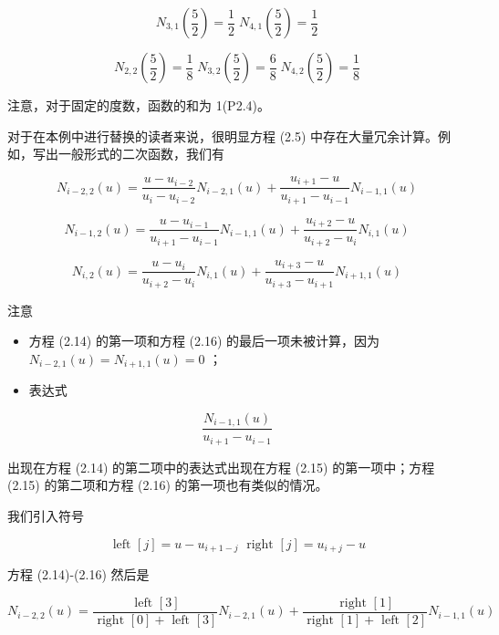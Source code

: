 \documentclass[../main.tex]{subfiles}
\begin{document}
\[
{N}_{3,1}\left( \frac{5}{2}\right)  = \frac{1}{2}\;{N}_{4,1}\left( \frac{5}{2}\right)  = \frac{1}{2}
\]

\[
{N}_{2,2}\left( \frac{5}{2}\right)  = \frac{1}{8}\;{N}_{3,2}\left( \frac{5}{2}\right)  = \frac{6}{8}\;{N}_{4,2}\left( \frac{5}{2}\right)  = \frac{1}{8}
\]

注意，对于固定的度数，函数的和为 1(P2.4)。

对于在本例中进行替换的读者来说，很明显方程 (2.5) 中存在大量冗余计算。例如，写出一般形式的二次函数，我们有

\[
{N}_{i - 2,2}\left( u\right)  = \frac{u - {u}_{i - 2}}{{u}_{i} - {u}_{i - 2}}{N}_{i - 2,1}\left( u\right)  + \frac{{u}_{i + 1} - u}{{u}_{i + 1} - {u}_{i - 1}}{N}_{i - 1,1}\left( u\right)  \tag{2.14}
\]

\[
{N}_{i - 1,2}\left( u\right)  = \frac{u - {u}_{i - 1}}{{u}_{i + 1} - {u}_{i - 1}}{N}_{i - 1,1}\left( u\right)  + \frac{{u}_{i + 2} - u}{{u}_{i + 2} - {u}_{i}}{N}_{i,1}\left( u\right)  \tag{2.15}
\]

\[
{N}_{i,2}\left( u\right)  = \frac{u - {u}_{i}}{{u}_{i + 2} - {u}_{i}}{N}_{i,1}\left( u\right)  + \frac{{u}_{i + 3} - u}{{u}_{i + 3} - {u}_{i + 1}}{N}_{i + 1,1}\left( u\right)  \tag{2.16}
\]

注意

\begin{itemize}
\item 方程 (2.14) 的第一项和方程 (2.16) 的最后一项未被计算，因为 \({N}_{i - 2,1}\left( u\right)  = {N}_{i + 1,1}\left( u\right)  = 0\) ；
\end{itemize}

\begin{itemize}
\item 表达式
\end{itemize}

\[
\frac{{N}_{i - 1,1}\left( u\right) }{{u}_{i + 1} - {u}_{i - 1}}
\]

出现在方程 (2.14) 的第二项中的表达式出现在方程 (2.15) 的第一项中；方程 (2.15) 的第二项和方程 (2.16) 的第一项也有类似的情况。

我们引入符号

\[
\text{ left }\left\lbrack  j\right\rbrack   = u - {u}_{i + 1 - j}\;\text{ right }\left\lbrack  j\right\rbrack   = {u}_{i + j} - u
\]

方程 (2.14)-(2.16) 然后是

\[
{N}_{i - 2,2}\left( u\right)  = \frac{\text{ left }\left\lbrack  3\right\rbrack  }{\text{ right }\left\lbrack  0\right\rbrack   + \text{ left }\left\lbrack  3\right\rbrack  }{N}_{i - 2,1}\left( u\right)  + \frac{\text{ right }\left\lbrack  1\right\rbrack  }{\text{ right }\left\lbrack  1\right\rbrack   + \text{ left }\left\lbrack  2\right\rbrack  }{N}_{i - 1,1}\left( u\right)
\]
\end{document}
